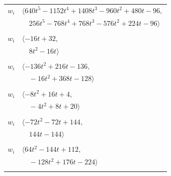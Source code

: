 \documentclass[11pt]{article}
\begin{document}
\begin{longtable}{@{}ll@{}}
$w_i$ & $\langle 640t^{5}-1152t^{4}+1408t^{3}-960t^{2}+480t-96,$\\
 & $\quad 256t^{5}-768t^{4}+768t^{3}-576t^{2}+224t-96\rangle$\\
\addlinespace[2pt]
\multicolumn{2}{@{}p{0.97\textwidth}@{}}{$i=25$, $D_i=4$, $\rho_{ij}$: $10{:}1, \allowbreak 11{:}1, \allowbreak 12{:}2, \allowbreak 33{:}1, \allowbreak 36{:}2, \allowbreak 43{:}1, \allowbreak 49{:}2$}\\
$w_i$ & $\langle -16t+32,$\\
 & $\quad 8t^{2}-16t\rangle$\\
\addlinespace[2pt]
\multicolumn{2}{@{}p{0.97\textwidth}@{}}{$i=26$, $D_i=8$, $\rho_{ij}$: $0{:}1, \allowbreak 2{:}1, \allowbreak 7{:}2, \allowbreak 10{:}2, \allowbreak 24{:}2, \allowbreak 30{:}1, \allowbreak 31{:}2, \allowbreak 33{:}2, \allowbreak 36{:}2, \allowbreak 53{:}2, \allowbreak 56{:}2, \allowbreak 59{:}1$}\\
$w_i$ & $\langle -136t^{2}+216t-136,$\\
 & $\quad -16t^{2}+368t-128\rangle$\\
\addlinespace[2pt]
\multicolumn{2}{@{}p{0.97\textwidth}@{}}{$i=27$, $D_i=4$, $\rho_{ij}$: $5{:}1, \allowbreak 9{:}1, \allowbreak 12{:}2, \allowbreak 18{:}1, \allowbreak 32{:}1, \allowbreak 41{:}2, \allowbreak 56{:}2$}\\
$w_i$ & $\langle -8t^{2}+16t+4,$\\
 & $\quad -4t^{2}+8t+20\rangle$\\
\addlinespace[2pt]
\multicolumn{2}{@{}p{0.97\textwidth}@{}}{$i=28$, $D_i=8$, $\rho_{ij}$: $2{:}1, \allowbreak 5{:}2, \allowbreak 13{:}1, \allowbreak 16{:}1, \allowbreak 17{:}2, \allowbreak 19{:}1, \allowbreak 23{:}1, \allowbreak 41{:}1, \allowbreak 50{:}2, \allowbreak 51{:}2, \allowbreak 57{:}1, \allowbreak 58{:}2$}\\
$w_i$ & $\langle -72t^{2}-72t+144,$\\
 & $\quad 144t-144\rangle$\\
\addlinespace[2pt]
\multicolumn{2}{@{}p{0.97\textwidth}@{}}{$i=29$, $D_i=16$, $\rho_{ij}$: $8{:}2, \allowbreak 13{:}1, \allowbreak 16{:}2, \allowbreak 17{:}2, \allowbreak 30{:}1, \allowbreak 33{:}1, \allowbreak 36{:}1, \allowbreak 43{:}2$}\\
$w_i$ & $\langle 64t^{2}-144t+112,$\\
 & $\quad -128t^{2}+176t-224\rangle$\\
\addlinespace[2pt]
\multicolumn{2}{@{}p{0.97\textwidth}@{}}{$i=30$, $D_i=16$, $\rho_{ij}$: $7{:}1, \allowbreak 8{:}1, \allowbreak 20{:}2, \allowbreak 26{:}2, \allowbreak 29{:}2, \allowbreak 35{:}1, \allowbreak 46{:}1, \allowbreak 47{:}1, \allowbreak 59{:}1$}\\

\end{longtable}
\end{document}

